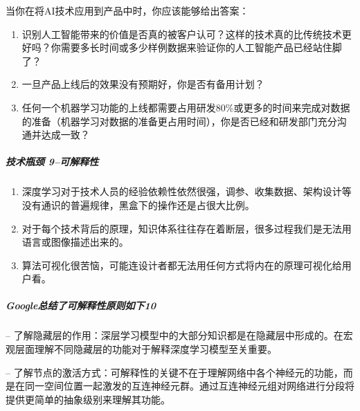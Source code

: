 \documentclass[letterpaper,11pt,english]{sphinxmanual}
\begin{document}
当你在将AI技术应用到产品中时，你应该能够给出答案：
\begin{enumerate}
%
\item {} 
识别人工智能带来的价值是否真的被客户认可？这样的技术真的比传统技术更好吗？你需要多长时间或多少样例数据来验证你的人工智能产品已经站住脚了？

\item {} 
一旦产品上线后的效果没有预期好，你是否有备用计划？

\item {} 
任何一个机器学习功能的上线都需要占用研发80\%或更多的时间来完成对数据的准备（机器学习对数据的准备更占用时间），你是否已经和研发部门充分沟通并达成一致？

\end{enumerate}


\subparagraph{技术瓶颈 9\sphinxfootnotemark[86]–可解释性}
\label{\detokenize{chapter_introduction/AI_PM:id11}}%
\begin{footnotetext}[86]\sphinxAtStartFootnote
{}
%
\end{footnotetext}\ignorespaces \begin{enumerate}
%
\item {} 
深度学习对于技术人员的经验依赖性依然很强，调参、收集数据、架构设计等没有通识的普遍规律，黑盒下的操作还是占很大比例。

\item {} 
对于每个技术背后的原理，知识体系往往存在着断层，很多过程我们是无法用语言或图像描述出来的。

\item {} 
算法可视化很苦恼，可能连设计者都无法用任何方式将内在的原理可视化给用户看。

\end{enumerate}


\subparagraph{Google总结了可解释性原则如下10\sphinxfootnotemark[87]}
\label{\detokenize{chapter_introduction/AI_PM:google10}}%
\begin{footnotetext}[87]\sphinxAtStartFootnote
{}
%
\end{footnotetext}\ignorespaces 
–
了解隐藏层的作用：深层学习模型中的大部分知识都是在隐藏层中形成的。在宏观层面理解不同隐藏层的功能对于解释深度学习模型至关重要。

–
了解节点的激活方式：可解释性的关键不在于理解网络中各个神经元的功能，而是在同一空间位置一起激发的互连神经元群。通过互连神经元组对网络进行分段将提供更简单的抽象级别来理解其功能。
\end{document}
